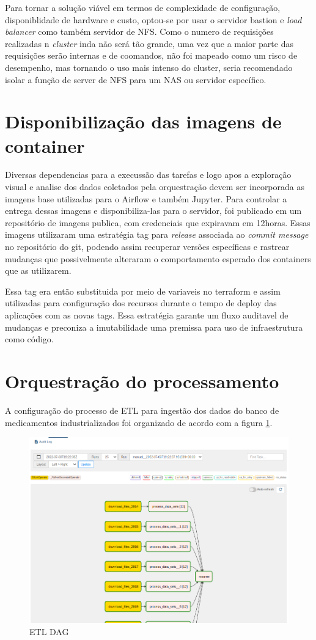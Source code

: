 Para tornar a solução viável em termos de complexidade de configuração, disponiblidade de hardware e custo, optou-se por usar o servidor bastion e \emph{load balancer} como também servidor de NFS. Como o numero de requisições realizadas n \emph{cluster} inda não será tão grande, uma vez que a maior parte das requisições serão internas e de coomandos, não foi mapeado como um risco de desempenho, mas tornando o uso mais intenso do cluster, seria recomendado isolar a função de server de NFS para um NAS ou servidor específico.

\section{Disponibilização das imagens de container}

Diversas dependencias para a execussão das tarefas e logo apos a exploração visual e analise dos dados coletados pela orquestração devem ser incorporada as imagens base utilizadas para o Airflow e também Jupyter. Para controlar a entrega dessas imagens e disponibiliza-las para o servidor, foi publicado em um repositório de imagens publica, com credenciais que expiravam em 12horas. Essas imagens utilizaram uma estratégia tag para \emph{release} associada ao \emph{commit message} no repositório do git, podendo assim recuperar versões específicas e rastrear mudanças que possivelmente alteraram o comportamento esperado dos containers que as utilizarem. 

Essa tag era então substituida por meio de variaveis no terraform e assim utilizadas para configuração dos recursos durante o tempo de deploy das aplicações com as novas tags. Essa estratégia garante um fluxo auditavel de mudanças e preconiza a imutabilidade uma premissa para uso de infraestrutura como código. 

\section{Orquestração do processamento}
A configuração do processo de ETL para ingestão dos dados do banco de medicamentos industrializados foi organizado de acordo com a figura \ref{fig:airflowdag}.
\begin{figure}[!ht]
    \centering
    \includegraphics[width=0.8\linewidth]{04-figuras/graph_execution.png}
    \caption{ETL DAG}
    \label{fig:airflowdag}
\end{figure}

